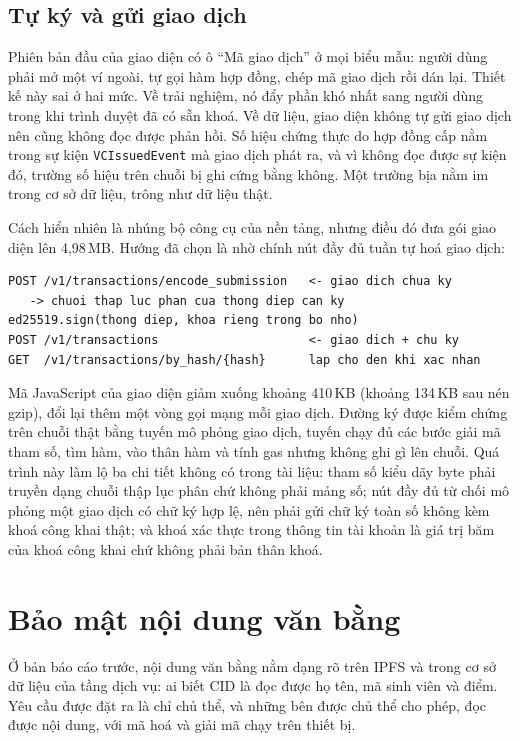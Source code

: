 \subsection{Tự ký và gửi giao dịch}

Phiên bản đầu của giao diện có ô ``Mã giao dịch'' ở mọi biểu mẫu: người dùng phải mở một ví ngoài, tự gọi hàm hợp đồng, chép mã giao dịch rồi dán lại. Thiết kế này sai ở hai mức. Về trải nghiệm, nó đẩy phần khó nhất sang người dùng trong khi trình duyệt đã có sẵn khoá. Về dữ liệu, giao diện không tự gửi giao dịch nên cũng không đọc được phản hồi. Số hiệu chứng thực do hợp đồng cấp nằm trong sự kiện \texttt{VCIssuedEvent} mà giao dịch phát ra, và vì không đọc được sự kiện đó, trường số hiệu trên chuỗi bị ghi cứng bằng không. Một trường bịa nằm im trong cơ sở dữ liệu, trông như dữ liệu thật.

Cách hiển nhiên là nhúng bộ công cụ của nền tảng, nhưng điều đó đưa gói giao diện lên 4,98\,MB. Hướng đã chọn là nhờ chính nút đầy đủ tuần tự hoá giao dịch:

\begin{lstlisting}
POST /v1/transactions/encode_submission   <- giao dich chua ky
   -> chuoi thap luc phan cua thong diep can ky
ed25519.sign(thong diep, khoa rieng trong bo nho)
POST /v1/transactions                     <- giao dich + chu ky
GET  /v1/transactions/by_hash/{hash}      lap cho den khi xac nhan
\end{lstlisting}

Mã JavaScript của giao diện giảm xuống khoảng 410\,KB (khoảng 134\,KB sau nén gzip), đổi lại thêm một vòng gọi mạng mỗi giao dịch. Đường ký được kiểm chứng trên chuỗi thật bằng tuyến mô phỏng giao dịch, tuyến chạy đủ các bước giải mã tham số, tìm hàm, vào thân hàm và tính gas nhưng không ghi gì lên chuỗi. Quá trình này làm lộ ba chi tiết không có trong tài liệu: tham số kiểu dãy byte phải truyền dạng chuỗi thập lục phân chứ không phải mảng số; nút đầy đủ từ chối mô phỏng một giao dịch có chữ ký hợp lệ, nên phải gửi chữ ký toàn số không kèm khoá công khai thật; và khoá xác thực trong thông tin tài khoản là giá trị băm của khoá công khai chứ không phải bản thân khoá.

\section{Bảo mật nội dung văn bằng}
\label{sec:ma-hoa}

Ở bản báo cáo trước, nội dung văn bằng nằm dạng rõ trên IPFS và trong cơ sở dữ liệu của tầng dịch vụ: ai biết CID là đọc được họ tên, mã sinh viên và điểm. Yêu cầu được đặt ra là chỉ chủ thể, và những bên được chủ thể cho phép, đọc được nội dung, với mã hoá và giải mã chạy trên thiết bị.

